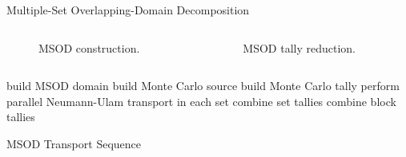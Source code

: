 \documentclass{beamer}
\begin{document}
\begin{frame}[fragile]{Multiple-Set Overlapping-Domain Decomposition}

  \begin{columns}

    \begin{column}{0.5\textwidth}

      \begin{figure}[htpb!]
        \begin{center}
          \scalebox{0.2}{  }
        \end{center}
        \caption{\small MSOD construction.}
      \end{figure}

    \end{column}

    \begin{column}{0.5\textwidth}

      \begin{figure}[htpb!]
        \begin{center}
          \scalebox{0.2}{  }
        \end{center}
        \caption{\small MSOD tally reduction.}
      \end{figure}

    \end{column}

  \end{columns}

    \begin{algorithm}[H]
      \begin{algorithmic}[1]
        \tiny
        \STATE build MSOD domain
        \STATE build Monte Carlo source
        \STATE build Monte Carlo tally
        \STATE perform parallel Neumann-Ulam transport in each set
        \STATE combine set tallies
        \STATE combine block tallies
      \end{algorithmic}
      \caption{MSOD Transport Sequence}
    \end{algorithm}

\end{frame}
\end{document}
